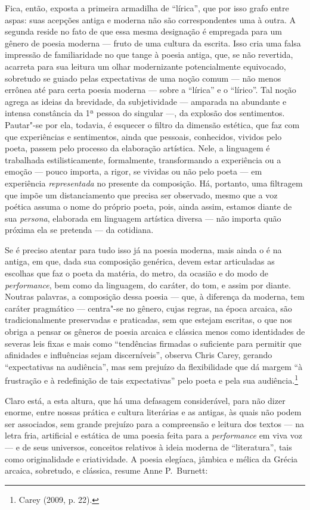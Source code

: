 Fica, então, exposta a primeira armadilha de “lírica”, que por isso grafo
entre aspas: suas acepções antiga e moderna não são correspondentes uma
à outra. A segunda reside no fato de que essa mesma designação é empregada para
um gênero de
poesia moderna --- fruto de uma cultura da escrita. Isso cria uma falsa impressão
de familiaridade no que tange à poesia antiga, que, se não revertida, acarreta
para sua leitura um olhar modernizante potencialmente equivocado, sobretudo se
guiado pelas expectativas de uma noção comum --- não menos errônea até para certa
poesia moderna --- sobre a “lírica” e o “lírico”. Tal noção agrega as ideias da
brevidade, da subjetividade --- amparada na abundante e intensa constância da
1ª pessoa do singular ---, da explosão dos sentimentos. Pautar"-se por
ela, todavia, é esquecer o filtro da dimensão estética, que faz com que
experiências e sentimentos, ainda que pessoais, conhecidos, vividos pelo poeta,
passem pelo processo da elaboração artística. Nele, a linguagem é trabalhada
estilisticamente, formalmente, transformando a experiência ou a emoção --- pouco
importa, a rigor, se vividas ou não pelo poeta --- em experiência
\textit{representada} no presente da composição. Há, portanto, uma filtragem
que impõe um distanciamento que precisa ser observado, mesmo que a voz poética
assuma o nome do próprio poeta, pois, ainda assim, estamos diante de sua
\textit{persona}, elaborada em linguagem artística diversa --- não importa
quão próxima ela se pretenda --- da cotidiana.

Se é preciso atentar para tudo isso já na poesia moderna, mais ainda o é na antiga, em que, dada sua composição genérica, devem
estar articuladas as escolhas que faz o poeta da matéria, do metro, da ocasião
e do modo de \textit{performance}, bem como da linguagem, do caráter, do tom, e
assim por diante. Noutras palavras, a composição dessa poesia --- que, à diferença
da moderna, tem caráter pragmático --- centra"-se no gênero, cujas regras,
na época arcaica, são tradicionalmente preservadas e praticadas, sem que
estejam escritas, o que nos obriga a pensar os gêneros de poesia arcaica e
clássica menos como identidades de severas leis fixas e mais como
“tendências firmadas o suficiente para permitir que afinidades e influências
sejam discerníveis”, observa Chris Carey, gerando
“expectativas na audiência”, mas sem prejuízo da flexibilidade que dá margem “à
frustração e à redefinição de tais expectativas” pelo poeta e pela sua
audiência.\footnote{ Carey (2009, p. 22).}

Claro está, a esta altura, que há uma defasagem considerável, para não dizer
enorme, entre nossas prática e cultura literárias e as antigas, às quais não
podem ser associados, sem grande prejuízo para a compreensão e leitura dos
textos --- na letra fria, artificial e estática de uma poesia feita para a
\textit{performance} em viva voz --- e de seus universos, conceitos relativos à
ideia moderna de “literatura”, tais como originalidade e criatividade. A poesia
elegíaca, jâmbica e mélica da Grécia arcaica, sobretudo, e clássica, resume
Anne P.~Burnett: 

